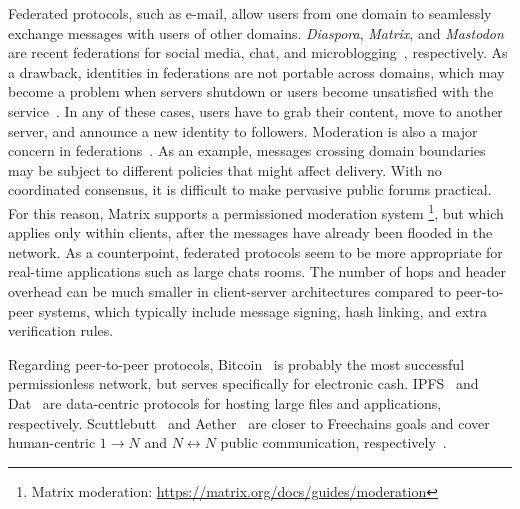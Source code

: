 \documentclass[12pt]{article}
\newcommand{\FC}       {Freechains\xspace}
\newcommand{\Xon} {$1{\rightarrow}N$\xspace}
\newcommand{\Xnn} {$N{\leftrightarrow}N$\xspace}
\begin{document}

Federated protocols, such as e-mail, allow users from one domain to seamlessly
exchange messages with users of other domains.
\emph{Diaspora}, \emph{Matrix}, and \emph{Mastodon} are recent federations for
social media, chat, and microblogging~\cite{p2p.ecosystem}, respectively.
%
As a drawback, identities in federations are not portable across domains, which
may become a problem when servers shutdown or users become unsatisfied with the
service~\cite{fed.distributed}.
In any of these cases, users have to grab their content, move to another
server, and announce a new identity to followers.
%
Moderation is also a major concern in federations~\cite{p2p.ecosystem}.
As an example, messages crossing domain boundaries may be subject to different
policies that might affect delivery.
With no coordinated consensus, it is difficult to make pervasive public forums
practical.
%
For this reason, Matrix supports a permissioned moderation system%
\footnote{Matrix moderation: \url{https://matrix.org/docs/guides/moderation}},
but which applies only within clients, after the messages have already been
flooded in the network.
%
As a counterpoint, federated protocols seem to be more appropriate for
real-time applications such as large chats rooms.
The number of hops and header overhead can be much smaller in client-server
architectures compared to peer-to-peer systems, which typically include message
signing, hash linking, and extra verification rules.


Regarding peer-to-peer protocols, Bitcoin~\cite{p2p.bitcoin} is probably the
most successful permissionless network, but serves specifically for electronic
cash.
IPFS~\cite{p2p.ipfs} and Dat~\cite{p2p.dat} are data-centric protocols for
hosting large files and applications, respectively.
Scuttlebutt~\cite{p2p.scuttlebutt} and Aether~\cite{p2p.ecosystem} are closer
to \FC goals and cover human-centric \Xon and \Xnn public communication,
respectively~\cite{fcs.sbseg20}.
\end{document}
